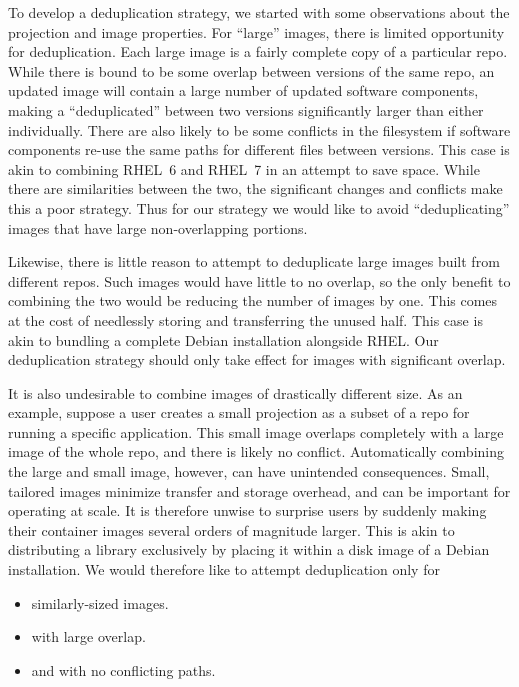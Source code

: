 \documentclass[conference]{IEEEtran}
\begin{document}
To develop a deduplication strategy,
we started with some observations about the projection and image properties.
For ``large'' images,
there is limited opportunity for deduplication.
Each large image is a fairly complete copy of a particular repo.
While there is bound to be some overlap between versions of the same repo,
an updated image will contain a large number of updated software components,
making a ``deduplicated'' between two versions significantly larger than either individually.
There are also likely to be some conflicts in the filesystem if software components re-use the same paths for different files between versions.
This case is akin to combining RHEL~6 and RHEL~7 in an attempt to save space.
While there are similarities between the two,
the significant changes and conflicts make this a poor strategy.
Thus for our strategy we would like to avoid ``deduplicating'' images that have large non-overlapping portions.

Likewise, there is little reason to attempt to deduplicate large images built from different repos.
Such images would have little to no overlap,
so the only benefit to combining the two would be reducing the number of images by one.
This comes at the cost of needlessly storing and transferring the unused half.
This case is akin to bundling a complete Debian installation alongside RHEL.
Our deduplication strategy should only take effect for images with significant overlap.

It is also undesirable to combine images of drastically different size.
As an example, suppose a user creates a small projection as a subset of a repo for running a specific application.
This small image overlaps completely with a large image of the whole repo,
and there is likely no conflict.
Automatically combining the large and small image, however,
can have unintended consequences.
Small, tailored images minimize transfer and storage overhead,
and can be important for operating at scale.
It is therefore unwise to surprise users by suddenly making their container images several orders of magnitude larger.
This is akin to distributing a library exclusively by placing it within a disk image of a Debian installation.
We would therefore like to attempt deduplication only for
\begin{itemize}
\item similarly-sized images.
\item with large overlap.
\item and with no conflicting paths.
\end{itemize}
\end{document}
